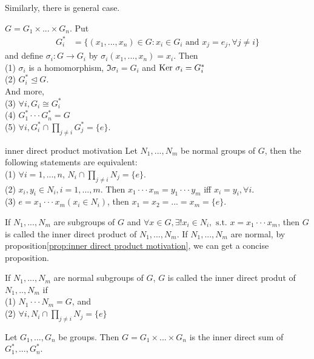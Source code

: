 Similarly, there is general case.

\begin{theorem}{}{}
    $G = G_1\times ... \times G_n$. Put
    \begin{align*}
        G_i^* &= \{(x_1,...,x_n)\in G:x_i\in G_i\text{ and }x_j=e_j, \forall j\neq i\}
    \end{align*}
    and define $\sigma_i : G\rightarrow G_i$ by $\sigma_i(x_1,...,x_n)=x_i$. Then\\
    (1) $\sigma_i$ is a homomorphism, $\Im \sigma_i = G_i$ and $\text{Ker }\sigma_i = G_i^*$\\
    (2) $G_i^*\unlhd G$.\\
    And more, \\
    (3) $\forall i, G_i\cong G_i^*$\\
    (4) $G_1^*\cdot\cdot\cdot G_n^*=G$\\
    (5) $\forall i, G_i^*\cap \prod_{j\neq i}G_j^*=\{e\}$.
\end{theorem}

\begin{proposition}{}{inner direct product motivation}
    Let $N_1,...,N_m$ be normal groups of $G$, then the following statements are equivalent:\\
    (1) $\forall i=1,...,n$, $N_i\cap \prod_{j\neq i}N_j=\{e\}$.\\
    (2) $x_i,y_i\in N_i, i=1,...,m$. Then $x_1\cdot\cdot\cdot x_m=y_1\cdot\cdot\cdot y_m$ iff $x_i=y_i, \forall i$.\\
    (3) $e=x_1\cdot\cdot\cdot x_m(x_i\in N_i)$, then $x_1=x_2=...=x_m=\{e\}$.
\end{proposition}

 
If $N_1,...,N_m$ are subgroups of $G$ and $\forall x\in G, \exists ! x_i\in N_i, \text{ s.t. } x=x_1\cdot\cdot\cdot x_m$,
then $G$ is called the inner direct product of $N_1,...,N_m$. If $N_1,...,N_m$ are normal, 
by proposition\ref{prop:inner direct product motivation}, 
we can get a concise proposition.

\begin{proposition}{}{}
    If $N_1,...,N_m$ are normal subgroups of $G$, $G$ is called the inner direct produt of $N_1,..,N_m$ if\\
    (1) $N_1\cdot\cdot\cdot N_m=G$, and\\
    (2) $\forall i, N_i\cap \prod_{j\neq i}N_j=\{e\}$
\end{proposition}

\begin{proposition}{}{}
    Let $G_1,...,G_n$ be groups. Then $G=G_1\times ...\times G_n$ is 
    the inner direct sum of $G_1^*,...,G_n^*$.
\end{proposition}


